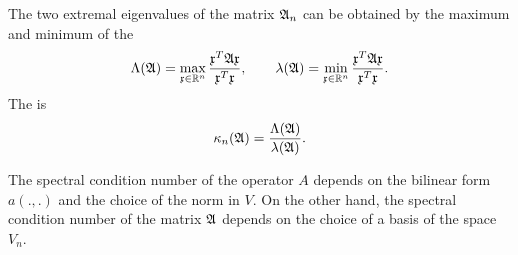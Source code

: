 \begin{definition}
  The two extremal eigenvalues of the matrix $\mathfrak{A}_n$ can be
  obtained by the maximum and minimum of the 
  \begin{gather}
    \label{eq:itintro:3}
    \Lambda(\mathfrak{A}) = \max_{\mathfrak{x}\in \mathbb R^n}\frac{\mathfrak{x}^T \mathfrak{A} \mathfrak{x}}{\mathfrak{x}^T\mathfrak{x}},
    \qquad
    \lambda(\mathfrak{A}) = \min_{\mathfrak{x}\in \mathbb R^n}\frac{\mathfrak{x}^T \mathfrak{A} \mathfrak{x}}{\mathfrak{x}^T\mathfrak{x}}.
  \end{gather}
  The  is
  \begin{gather*}
    \kappa_n(\mathfrak{A}) = \frac{\Lambda(\mathfrak{A})}{\lambda(\mathfrak{A})}.
  \end{gather*}
\end{definition}

\begin{note}
  The spectral condition number of the operator $A$ depends on the
  bilinear form $a(.,.)$ and the choice of the norm in $V$. On the
  other hand, the spectral condition number of the matrix $\mathfrak{A}$
  depends on the choice of a basis of the space $V_n$.
\end{note}

